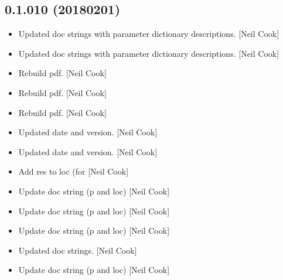 \documentclass[a4paper,10pt,english]{report}
\begin{document}
\subsection{0.1.010 (2018\sphinxhyphen{}02\sphinxhyphen{}01)}
\label{\detokenize{misc/changelog:id513}}\begin{itemize}
\item {} 
Updated doc strings with parameter dictionary descriptions. {[}Neil
Cook{]}

\item {} 
Updated doc strings with parameter dictionary descriptions. {[}Neil
Cook{]}

\item {} 
Rebuild pdf. {[}Neil Cook{]}

\item {} 
Rebuild pdf. {[}Neil Cook{]}

\item {} 
Rebuild pdf. {[}Neil Cook{]}

\item {} 
Updated date and version. {[}Neil Cook{]}

\item {} 
Updated date and version. {[}Neil Cook{]}

\item {} 
Add res to loc (for  {[}Neil Cook{]}

\item {} 
Update doc string (p and loc) {[}Neil Cook{]}

\item {} 
Update doc string (p and loc) {[}Neil Cook{]}

\item {} 
Update doc string (p and loc) {[}Neil Cook{]}

\item {} 
Updated doc strings. {[}Neil Cook{]}

\item {} 
Update doc string (p and loc) {[}Neil Cook{]}

\end{itemize}
\end{document}
